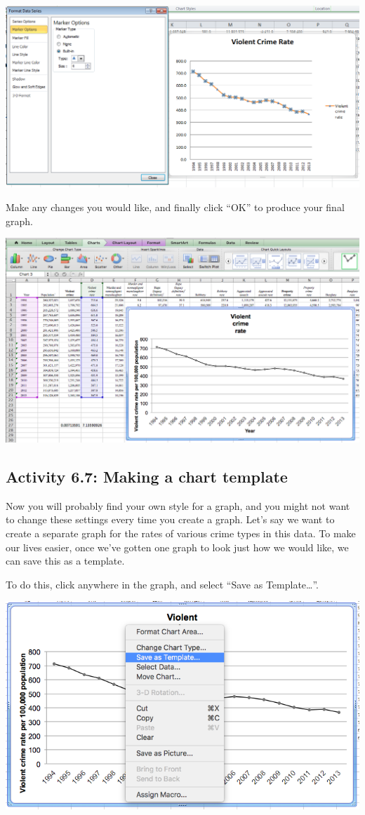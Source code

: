 \documentclass[
]{book}
\begin{document}
\includegraphics{imgs/pc_edit_marker.png}

Make any changes you would like, and finally click ``OK'' to produce your final graph.

\includegraphics{imgs/desc_line_final.png}

\hypertarget{activity-6.7-making-a-chart-template}{%
\subsection{Activity 6.7: Making a chart template}\label{activity-6.7-making-a-chart-template}}

Now you will probably find your own style for a graph, and you might not want to change these settings every time you create a graph. Let's say we want to create a separate graph for the rates of various crime types in this data. To make our lives easier, once we've gotten one graph to look just how we would like, we can save this as a template.

To do this, click anywhere in the graph, and select ``Save as Template\ldots{}''.

\includegraphics{imgs/save_as_template.png}
\end{document}
